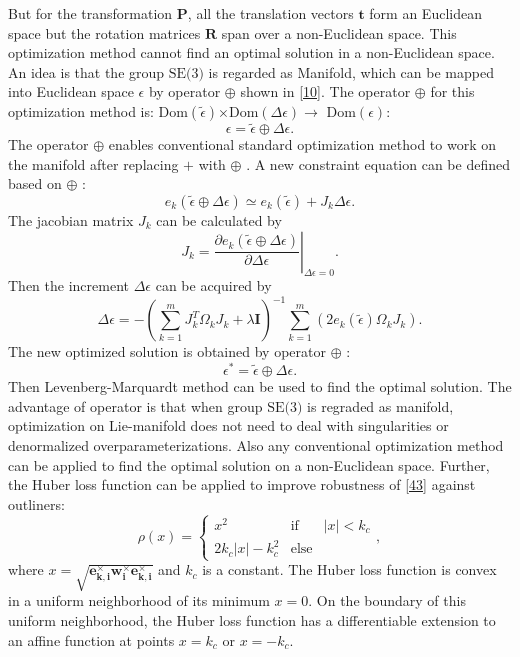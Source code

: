 \documentclass[journal]{IEEEtran}
\begin{document}
But for the transformation $\mathbf P$, all the translation vectors $\mathbf{t}$ form an Euclidean space but the rotation matrices $\mathbf{R}$ span over a non-Euclidean space. This optimization method cannot find an optimal solution in a non-Euclidean space. An idea is that
the group $\text{SE(3)}$ is regarded as Manifold, which can be mapped into Euclidean space $\epsilon$ by operator $\oplus$ shown in \eqref{10}. The operator $\oplus$ for this optimization method is: Dom$(\widetilde \epsilon)$$\times$Dom$(\Delta \epsilon)$$\rightarrow$ Dom$(\epsilon)$:
\begin{equation}\label{49}
\epsilon = \widetilde \epsilon\oplus\Delta \epsilon. 
\end{equation}
The operator $\oplus$ enables conventional standard optimization method to work on the manifold after replacing $+$ with $\oplus$ \cite{Kummerle:2011cz}. A new constraint equation can be defined based on $\oplus$ :
\begin{equation}\label{50}
e_{k}(\widetilde \epsilon \oplus \Delta \epsilon) \simeq e_{k}(\widetilde \epsilon) + J_{k} \Delta \epsilon.
\end{equation}
The jacobian matrix $J_{k}$ can be calculated by
\begin{equation}\label{51}
J_{k} = \left. \frac{\partial e_{k}(\widetilde \epsilon  \oplus \Delta \epsilon)}{\partial \Delta \epsilon} \right|_{\Delta \epsilon = 0}.
\end{equation}
Then the increment $\Delta \epsilon$ can be acquired by
\begin{equation}\label{52}
\Delta \epsilon = - (\sum_{k=1}^{m}J_k^{T}\Omega_k J_k + \lambda \mathbf{I})^{-1}\sum_{k=1}^{m}(2e_k(\widetilde \epsilon)\Omega_k J_k).
\end{equation}
The new optimized solution is obtained by operator $\oplus$ :
\begin{equation}\label{53}
\epsilon^{\ast} = \widetilde \epsilon \oplus \Delta \epsilon.
\end{equation}
Then Levenberg-Marquardt method can be used to find the optimal solution. The advantage of operator is that when group $\text{SE(3)}$ is regraded as manifold, optimization on Lie-manifold does not need to deal with singularities or denormalized overparameterizations. Also any conventional optimization method can be applied to find the optimal solution on a non-Euclidean space.
Further, the Huber loss function can be applied to improve robustness of \eqref{43} against outliners: 
\begin{equation}\label{56}
\rho(x) = \left\{ \begin{array}{lll}
x^2 & \mbox{if}
& |x|<k_c \\ 2k_c|x| - k_c^2 & \mbox{else}
\end{array}\right.,
\end{equation}
where $x = \mathbf {\sqrt{\mathbf e_{k,i}^{\times}\mathbf w_{i}^{\times}\mathbf e_{k,i}^{\times}}}$ and $k_c$ is a constant. 
The Huber loss function is convex in a uniform neighborhood of its minimum $x=0$. On the boundary of this uniform neighborhood, the Huber loss function has a differentiable extension to an affine function at points $x = k_c$ or $x = -k_c$.
\end{document}
